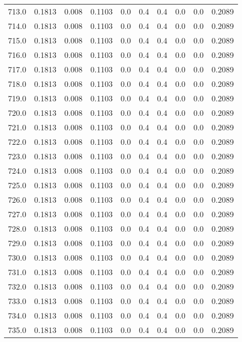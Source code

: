 \begin{longtable}{lrrrrrrrrr}
713.0 & 0.1813 & 0.008 & 0.1103 & 0.0 & 0.4 & 0.4 & 0.0 & 0.0 & 0.2089 \\
714.0 & 0.1813 & 0.008 & 0.1103 & 0.0 & 0.4 & 0.4 & 0.0 & 0.0 & 0.2089 \\
715.0 & 0.1813 & 0.008 & 0.1103 & 0.0 & 0.4 & 0.4 & 0.0 & 0.0 & 0.2089 \\
716.0 & 0.1813 & 0.008 & 0.1103 & 0.0 & 0.4 & 0.4 & 0.0 & 0.0 & 0.2089 \\
717.0 & 0.1813 & 0.008 & 0.1103 & 0.0 & 0.4 & 0.4 & 0.0 & 0.0 & 0.2089 \\
718.0 & 0.1813 & 0.008 & 0.1103 & 0.0 & 0.4 & 0.4 & 0.0 & 0.0 & 0.2089 \\
719.0 & 0.1813 & 0.008 & 0.1103 & 0.0 & 0.4 & 0.4 & 0.0 & 0.0 & 0.2089 \\
720.0 & 0.1813 & 0.008 & 0.1103 & 0.0 & 0.4 & 0.4 & 0.0 & 0.0 & 0.2089 \\
721.0 & 0.1813 & 0.008 & 0.1103 & 0.0 & 0.4 & 0.4 & 0.0 & 0.0 & 0.2089 \\
722.0 & 0.1813 & 0.008 & 0.1103 & 0.0 & 0.4 & 0.4 & 0.0 & 0.0 & 0.2089 \\
723.0 & 0.1813 & 0.008 & 0.1103 & 0.0 & 0.4 & 0.4 & 0.0 & 0.0 & 0.2089 \\
724.0 & 0.1813 & 0.008 & 0.1103 & 0.0 & 0.4 & 0.4 & 0.0 & 0.0 & 0.2089 \\
725.0 & 0.1813 & 0.008 & 0.1103 & 0.0 & 0.4 & 0.4 & 0.0 & 0.0 & 0.2089 \\
726.0 & 0.1813 & 0.008 & 0.1103 & 0.0 & 0.4 & 0.4 & 0.0 & 0.0 & 0.2089 \\
727.0 & 0.1813 & 0.008 & 0.1103 & 0.0 & 0.4 & 0.4 & 0.0 & 0.0 & 0.2089 \\
728.0 & 0.1813 & 0.008 & 0.1103 & 0.0 & 0.4 & 0.4 & 0.0 & 0.0 & 0.2089 \\
729.0 & 0.1813 & 0.008 & 0.1103 & 0.0 & 0.4 & 0.4 & 0.0 & 0.0 & 0.2089 \\
730.0 & 0.1813 & 0.008 & 0.1103 & 0.0 & 0.4 & 0.4 & 0.0 & 0.0 & 0.2089 \\
731.0 & 0.1813 & 0.008 & 0.1103 & 0.0 & 0.4 & 0.4 & 0.0 & 0.0 & 0.2089 \\
732.0 & 0.1813 & 0.008 & 0.1103 & 0.0 & 0.4 & 0.4 & 0.0 & 0.0 & 0.2089 \\
733.0 & 0.1813 & 0.008 & 0.1103 & 0.0 & 0.4 & 0.4 & 0.0 & 0.0 & 0.2089 \\
734.0 & 0.1813 & 0.008 & 0.1103 & 0.0 & 0.4 & 0.4 & 0.0 & 0.0 & 0.2089 \\
735.0 & 0.1813 & 0.008 & 0.1103 & 0.0 & 0.4 & 0.4 & 0.0 & 0.0 & 0.2089 \\

\end{longtable}
